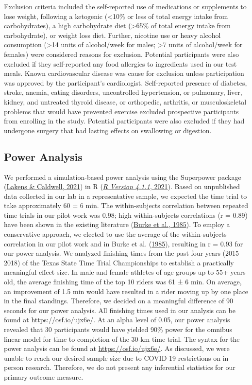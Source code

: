 \documentclass[]{cik}%
\begin{document}
Exclusion criteria included the self-reported use of medications or
supplements to lose weight, following a ketogenic (\textless10\% or less
of total energy intake from carbohydrates), a high carbohydrate diet
(\textgreater65\% of total energy intake from carbohydrate), or weight
loss diet. Further, nicotine use or heavy alcohol consumption
(\textgreater14 units of alcohol/week for males; \textgreater7 units of
alcohol/week for females) were considered reasons for exclusion.
Potential participants were also excluded if they self-reported any food
allergies to ingredients used in our test meals. Known cardiovascular
disease was cause for exclusion unless participation was approved by the
participant's cardiologist. Self-reported presence of diabetes, stroke,
anemia, eating disorders, uncontrolled hypertension, or pulmonary,
liver, kidney, and untreated thyroid disease, or orthopedic, arthritis,
or musculoskeletal problems that would have prevented exercise excluded
prospective participants from enrolling in the study. Potential
participants were also excluded if they had undergone surgery that had
lasting effects on swallowing or digestion.

\hypertarget{power-analysis}{%
\subsection{Power Analysis}\label{power-analysis}}

We performed a simulation-based power analysis using the Superpower
package (\protect\hyperlink{ref-38}{Lakens \& Caldwell, 2021}) in R
(\protect\hyperlink{ref-31}{\emph{R Version 4.1.1}, 2021}). Based on
unpublished data collected in our lab in a representative sample, we
expected the time trial to take approximately 60 ± 6 min. The
within-subjects correlation between repeated time trials in our pilot
work was 0.98; high within-subjects correlations (r = 0.89) have been
shown in the existing literature (\protect\hyperlink{ref-18}{Burke et
al., 1985}). To employ a conservative approach, we elected to use the
average of the within-subjects correlation in our pilot work and in
Burke et al. (\protect\hyperlink{ref-18}{1985}), resulting in r = 0.93
for our power analysis. We analyzed finishing times from the past four
years (2015-2018) of the Texas State Time Trial Championships to
establish a practically meaningful effect size. In male and female
athletes of age groups up to 55+ years old, the average finishing time
of the top 10 riders was 61 ± 6 min. On average, an improvement of 1.5
min would have resulted in a rider moving up by one place in the final
standings. Therefore, we decided on a meaningful difference of 90
seconds for our power analysis. All finishing times used in our analysis
can be found at \url{https://osf.io/ujx6e/}. At an alpha level of 0.05,
our power analysis revealed that 30 participants would have yielded 90\%
power for the omnibus linear model for time to completion of the 30-km
time trial. The syntax for the power analysis can be found at
\url{https://osf.io/ujx6e/}. As discussed, we were unable to reach our
desired sample size due to COVID-19 restrictions on in-person research.
Therefore, we do not present any inferential statistics for our primary
outcome measure.
\end{document}
